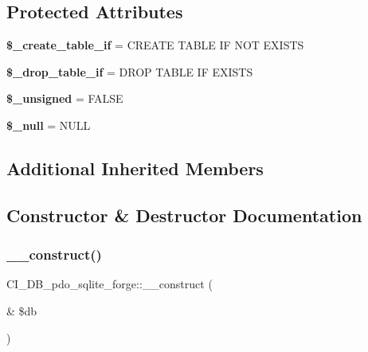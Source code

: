 \subsection*{Protected Attributes}
\begin{DoxyCompactItemize}
\item 
\mbox{\label{class_c_i___d_b__pdo__sqlite__forge_ab2fa01f9f3ed4f19c7358ebd417c5fc1}} 
{\bfseries \$\+\_\+create\+\_\+table\+\_\+if} = \textquotesingle{}C\+R\+E\+A\+TE T\+A\+B\+LE IF N\+OT E\+X\+I\+S\+TS\textquotesingle{}
\item 
\mbox{\label{class_c_i___d_b__pdo__sqlite__forge_a86c22884c27bfec523b0929ea30cd381}} 
{\bfseries \$\+\_\+drop\+\_\+table\+\_\+if} = \textquotesingle{}D\+R\+OP T\+A\+B\+LE IF E\+X\+I\+S\+TS\textquotesingle{}
\item 
\mbox{\label{class_c_i___d_b__pdo__sqlite__forge_a86da507f8f4b370fb56607a8e6fcc586}} 
{\bfseries \$\+\_\+unsigned} = F\+A\+L\+SE
\item 
\mbox{\label{class_c_i___d_b__pdo__sqlite__forge_a7184e33b8615e15c414fac2f997e6676}} 
{\bfseries \$\+\_\+null} = \textquotesingle{}N\+U\+LL\textquotesingle{}
\end{DoxyCompactItemize}
\subsection*{Additional Inherited Members}


\subsection{Constructor \& Destructor Documentation}
\mbox{\label{class_c_i___d_b__pdo__sqlite__forge_a32f804812e66a892ba61c22224423d04}} 
\subsubsection{\texorpdfstring{\+\_\+\+\_\+construct()}{\_\_construct()}}
{\footnotesize\ttfamily C\+I\+\_\+\+D\+B\+\_\+pdo\+\_\+sqlite\+\_\+forge\+::\+\_\+\+\_\+construct (\begin{DoxyParamCaption}\item[{\&}]{\$db }\end{DoxyParamCaption})}

